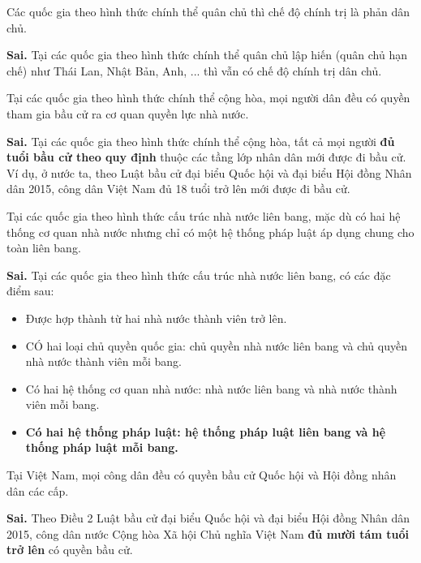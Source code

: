 \begin{ques}
Các quốc gia theo hình thức chính thể quân chủ thì chế độ chính trị là phản dân chủ.
\end{ques}
\begin{ans}
\textbf{Sai.} Tại các quốc gia theo hình thức chính thể quân chủ lập hiến (quân chủ hạn chế) như Thái Lan, Nhật Bản, Anh, ... thì vẫn có chế độ chính trị dân chủ.
\end{ans}

\begin{ques}
Tại các quốc gia theo hình thức chính thể cộng hòa, mọi người dân đều có quyền tham gia bầu cử ra cơ quan quyền lực nhà nước.
\end{ques}
\begin{ans}
\textbf{Sai.} Tại các quốc gia theo hình thức chính thể cộng hòa, tất cả mọi người \textbf{đủ tuổi bầu cử theo quy định} thuộc các tầng lớp nhân dân mới được đi bầu cử. Ví dụ, ở nước ta, theo Luật bầu cử đại biểu Quốc hội và đại biểu Hội đồng Nhân dân 2015, công dân Việt Nam đủ 18 tuổi trở lên mới được đi bầu cử.
\end{ans}

\begin{ques}
Tại các quốc gia theo hình thức cấu trúc nhà nước liên bang, mặc dù có hai hệ thống cơ quan nhà nước nhưng chỉ có một hệ thống pháp luật áp dụng chung cho toàn liên bang.
\end{ques}
\begin{ans}
\textbf{Sai.} Tại các quốc gia theo hình thức cấu trúc nhà nước liên bang, có các đặc điểm sau:
\begin{itemize}
\item Được hợp thành từ hai nhà nước thành viên trở lên.
\item CÓ hai loại chủ quyền quốc gia: chủ quyền nhà nước liên bang và chủ quyền nhà nước thành viên mỗi bang.
\item Có hai hệ thống cơ quan nhà nước: nhà nước liên bang và nhà nước thành viên mỗi bang.
\item \textbf{Có hai hệ thống pháp luật: hệ thống pháp luật liên bang và hệ thống pháp luật mỗi bang.}
\end{itemize}
\end{ans}

\begin{ques}
Tại Việt Nam, mọi công dân đều có quyền bầu cử Quốc hội và Hội đồng nhân dân các cấp.
\end{ques}
\begin{ans}
\textbf{Sai.} Theo Điều 2 Luật bầu cử đại biểu Quốc hội và đại biểu Hội đồng Nhân dân 2015, công dân nước Cộng hòa Xã hội Chủ nghĩa Việt Nam \textbf{đủ mười tám tuổi trở lên} có quyền bầu cử.
\end{ans}

